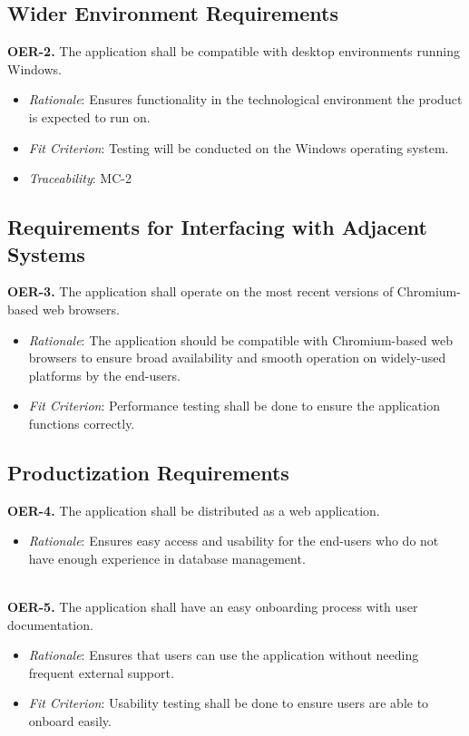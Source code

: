 \documentclass[12pt]{article}
\begin{document}
\subsection{Wider Environment Requirements}
\textbf{OER-2.} The application shall be compatible with desktop environments running Windows.
    \begin{itemize}
      \item \textit{Rationale}: Ensures functionality in the technological environment the product is expected to run on.
      \item \textit{Fit Criterion}: Testing will be conducted on the Windows operating system.
      \item \textit{Traceability}: MC-2
    \end{itemize}

\subsection{Requirements for Interfacing with Adjacent Systems}
\textbf{OER-3.} The application shall operate on the most recent versions of Chromium-based web browsers.
    \begin{itemize}
      \item \textit{Rationale}: The application should be compatible with Chromium-based web browsers to ensure broad availability and smooth operation on widely-used platforms by the end-users.
      \item \textit{Fit Criterion}: Performance testing shall be done to ensure the application functions correctly.
    \end{itemize}

\subsection{Productization Requirements}
\textbf{OER-4.} The application shall be distributed as a web application.
    \begin{itemize}
      \item \textit{Rationale}: Ensures easy access and usability for the end-users who do not have enough experience in database management.
    \end{itemize}
\ \\
\textbf{OER-5.} The application shall have an easy onboarding process with user documentation.
    \begin{itemize}
      \item \textit{Rationale}: Ensures that users can use the application without needing frequent external support.
      \item \textit{Fit Criterion}: Usability testing shall be done to ensure users are able to onboard easily.
    \end{itemize}
\end{document}
